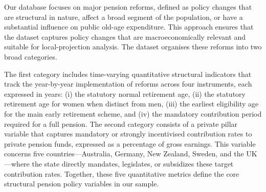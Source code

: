 \documentclass[11pt,english,a4paper, twoside, authoryear]{article}
\begin{document}
Our database focuses on major pension reforms, defined as policy changes that are structural in nature, affect a broad segment of the population, or have a substantial influence on public old-age expenditure. This approach ensures that the dataset captures policy changes that are macroeconomically relevant and suitable for local-projection analysis. The dataset organises these reforms into two broad categories.


The first category includes time-varying quantitative structural indicators that track the year-by-year implementation of reforms across four instruments, each expressed in years:  (i) the statutory normal retirement age, (ii) the statutory retirement age for women when distinct from men, (iii) the earliest eligibility age for the main early retirement scheme, and (iv) the mandatory contribution period required for a full pension. %
The second category consists of a private pillar variable that captures mandatory or strongly incentivised contribution rates to private pension funds, expressed as a percentage of gross earnings. This variable concerns five countries---Australia, Germany, New Zealand, Sweden, and the UK---where the state directly mandates, legislates, or subsidizes these target contribution rates. Together, these five quantitative metrics define the core structural pension policy variables in our sample.


\end{document}
